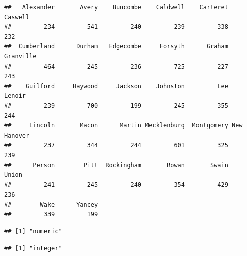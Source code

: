 \documentclass[12pt,]{article}
\newenvironment{Shaded}{\begin{snugshade}}{\end{snugshade}}
\newcommand{\KeywordTok}[1]{\textcolor[rgb]{0.13,0.29,0.53}{\textbf{#1}}}
\newcommand{\FloatTok}[1]{\textcolor[rgb]{0.00,0.00,0.81}{#1}}
\newcommand{\OperatorTok}[1]{\textcolor[rgb]{0.81,0.36,0.00}{\textbf{#1}}}
\newcommand{\NormalTok}[1]{#1}
\begin{document}
\begin{Shaded}
\end{Shaded}

\begin{verbatim}
##   Alexander       Avery    Buncombe    Caldwell    Carteret     Caswell 
##         234         541         240         239         338         232 
##  Cumberland      Durham   Edgecombe     Forsyth      Graham   Granville 
##         464         245         236         725         227         243 
##    Guilford     Haywood     Jackson    Johnston         Lee      Lenoir 
##         239         700         199         245         355         244 
##     Lincoln       Macon      Martin Mecklenburg  Montgomery New Hanover 
##         237         344         244         601         325         239 
##      Person        Pitt  Rockingham       Rowan       Swain       Union 
##         241         245         240         354         429         236 
##        Wake      Yancey 
##         339         199
\end{verbatim}

\begin{Shaded}
\end{Shaded}

\begin{verbatim}
## [1] "numeric"
\end{verbatim}

\begin{Shaded}
\end{Shaded}

\begin{verbatim}
## [1] "integer"
\end{verbatim}

\begin{Shaded}
\end{Shaded}
\end{document}
